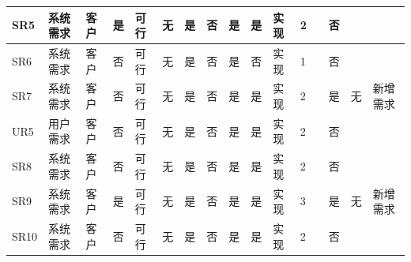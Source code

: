 \documentclass[a4paper]{ctexart}
\begin{document}
{\begin{longtable}{|P{4em}|P{4em}|P{2em}|P{2em}|P{2em}|P{1em}|P{3em}|P{3em}|P{4em}|P{4em}|P{2em}|P{2em}|P{3em}|P{3em}|P{4em}|P{4em}|}
  \hline
  SR5                                          & 系统需求                            & 客户                                         & 是                                            & 可行                    & 无   & 是           & 否           & 是             & 是             & 实现     & 2      &            & 否           &                 &                        \\
  \hline
  SR6                                          & 系统需求                            & 客户                                         & 否                                            & 可行                    & 无   & 是           & 否           & 是             & 否             & 实现     & 1      &            & 否           &                 &                        \\
  \hline
  SR7                                          & 系统需求                            & 客户                                         & 否                                            & 可行                    & 无   & 是           & 否           & 是             & 是             & 实现     & 2      &            & 是           & 无              & 新增需求               \\
  \hline
  UR5                                          & 用户需求                            & 客户                                         & 否                                            & 可行                    & 无   & 是           & 否           & 是             & 是             & 实现     & 2      &            & 否           &                 &                        \\
  \hline
  SR8                                          & 系统需求                            & 客户                                         & 否                                            & 可行                    & 无   & 是           & 否           & 是             & 是             & 实现     & 2      &            & 否           &                 &                        \\
  \hline
  SR9                                          & 系统需求                            & 客户                                         & 是                                            & 可行                    & 无   & 是           & 否           & 是             & 是             & 实现     & 3      &            & 是           & 无              & 新增需求               \\
  \hline
  SR10                                         & 系统需求                            & 客户                                         & 否                                            & 可行                    & 无   & 是           & 否           & 是             & 是             & 实现     & 2      &            & 否           &                 &                        \\

\end{longtable}}
\end{document}
